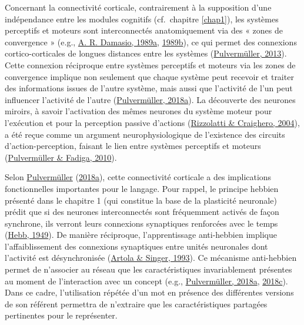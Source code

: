 \documentclass[
  a4paper,12pt,twoside,onecolumn,openright,final,oldfontcommands]{memoir}
\begin{document}
Concernant la connectivité corticale, contrairement à la supposition d'une indépendance entre les modules cognitifs (cf.~chapitre \ref{chap1}), les systèmes perceptifs et moteurs sont interconnectés anatomiquement via des « zones de convergence » (e.g., \protect\hyperlink{ref-damasio_brain_1989}{A. R. Damasio, 1989a}, \protect\hyperlink{ref-damasio_time-locked_1989}{1989b}), ce qui permet des connexions cortico-corticales de longues distances entre les systèmes (\protect\hyperlink{ref-pulvermuller_how_2013}{Pulvermüller, 2013}). Cette connexion réciproque entre systèmes perceptifs et moteurs via les zones de convergence implique non seulement que chaque système peut recevoir et traiter des informations issues de l'autre système, mais aussi que l'activité de l'un peut influencer l'activité de l'autre (\protect\hyperlink{ref-pulvermuller_neural_2018}{Pulvermüller, 2018a}). La découverte des neurones miroirs, à savoir l'activation des mêmes neurones du système moteur pour l'exécution et pour la perception passive d'actions (\protect\hyperlink{ref-rizzolatti_mirror-neuron_2004}{Rizzolatti \& Craighero, 2004}), a été reçue comme un argument neurophysiologique de l'existence des circuits d'action-perception, faisant le lien entre systèmes perceptifs et moteurs (\protect\hyperlink{ref-pulvermuller_active_2010}{Pulvermüller \& Fadiga, 2010}).

Selon \protect\hyperlink{ref-pulvermuller_neural_2018}{Pulvermüller} (\protect\hyperlink{ref-pulvermuller_neural_2018}{2018a}), cette connectivité corticale a des implications fonctionnelles importantes pour le langage. Pour rappel, le principe hebbien présenté dans le chapitre 1 (qui constitue la base de la plasticité neuronale) prédit que si des neurones interconnectés sont fréquemment activés de façon synchrone, ils verront leurs connexions synaptiques renforcées avec le temps (\protect\hyperlink{ref-hebb_organization_1949}{Hebb, 1949}). De manière réciproque, l'apprentissage anti-hebbien implique l'affaiblissement des connexions synaptiques entre unités neuronales dont l'activité est désynchronisée (\protect\hyperlink{ref-artola_long-term_1993}{Artola \& Singer, 1993}). Ce mécanisme anti-hebbien permet de n'associer au réseau que les caractéristiques invariablement présentes au moment de l'interaction avec un concept (e.g., \protect\hyperlink{ref-pulvermuller_neural_2018}{Pulvermüller, 2018a}, \protect\hyperlink{ref-pulvermuller_case_2018}{2018c}). Dans ce cadre, l'utilisation répétée d'un mot en présence des différentes versions de son référent permettra de n'extraire que les caractéristiques partagées pertinentes pour le représenter.
\end{document}
